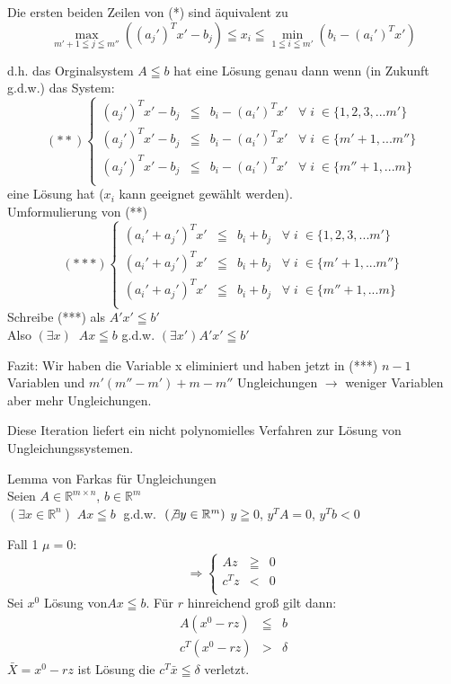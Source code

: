 \documentclass[12pt,titlepage,a4paper] {report}
\newcommand{\RR}{\mathbb{R}}
\begin{document}
Die ersten beiden Zeilen von (*) sind äquivalent zu
\[\max_{m'+1\leqq j \leqq m''} \left((a_{j}')^{T} x' -b_{j}\right) \leqq x_{i}
\leqq \min_{1\leqq i \leqq m'} \left(b_{i} - (a_{i}')^{T}x'\right)\]

d.h. das Orginalsystem $A \leqq b$ hat eine Lösung genau dann wenn (in
Zukunft g.d.w.) das System:
\[
(**)\left\{\begin{array}{rcl}
(a_{j}')^{T}x' -b_{j} &\leqq& b_{i} - (a_{i}')^{T}x'\;\;\; \forall \; i \; \in
\{1,2,3,...m'\}\\
(a_{j}')^{T}x' -b_{j} &\leqq& b_{i} - (a_{i}')^{T}x'\;\;\; \forall \; i \; \in
\{m'+1,...m''\}\\
(a_{j}')^{T}x' -b_{j} &\leqq& b_{i} - (a_{i}')^{T}x'\;\;\; \forall \; i \; \in
\{m''+1,...m\}\\
\end{array}\right.
\]
eine Lösung hat ($x_{i}$ kann geeignet gewählt werden).\\
Umformulierung von (**)
\[
(***)\left\{\begin{array}{rcl}
(a_{i}'+a_{j}')^{T} x' &\leqq& b_{i} + b_{j}\;\;\; \forall \; i \; \in
\{1,2,3,...m'\}\\
(a_{i}'+a_{j}')^{T} x' &\leqq& b_{i} + b_{j}\;\;\; \forall \; i \; \in
\{m'+1,...m''\}\\
(a_{i}'+a_{j}')^{T} x' &\leqq& b_{i} + b_{j}\;\;\; \forall \; i \; \in
\{m''+1,...m\}\\
\end{array}\right.
\]
Schreibe (***) als $A'x'\leqq b'$\\
Also $(\exists x) \; \; Ax\leqq b$ g.d.w. $(\exists x') A' x' \leqq b'$

Fazit: Wir haben die Variable x eliminiert und haben jetzt in (***) $n-1$
Variablen und $m'(m''-m')+m-m''$ Ungleichungen $\rightarrow$ weniger
Variablen aber mehr Ungleichungen.

Diese Iteration liefert ein nicht polynomielles Verfahren zur Lösung von
Ungleichungssystemen.

\begin{satz}
Lemma von Farkas für Ungleichungen\\
Seien $A \in \RR^{m\times n}$, $b\in \RR^{m}$\\
$(\exists x \in \RR^{n})$ $Ax \leqq b\;$ g.d.w. $\;(\not\exists y \in \RR^{m})$
$y\geqq 0$, $y^{T}A=0$, $y^{T}b < 0$
\end{satz}


%
%

Fall 1 $\mu =0$:
\[\Rightarrow \left\{ \begin{array}{rcl}
Az &\geqq & 0\\
c^{T}z&<&0\\
\end{array}\right.\]
Sei $x^{0}$ Lösung von$Ax\leqq b$. Für $r$ hinreichend groß gilt dann:
\[\begin{array}{rcl}A(x^{0} -rz) &\leqq& b\\
c^{T}(x^{0}-rz)&>&\delta\end{array}\]
$\bar{X}=x^{0} -rz$ ist Lösung die $c^{T}\bar{x} \leqq \delta$ verletzt.
\end{document}
